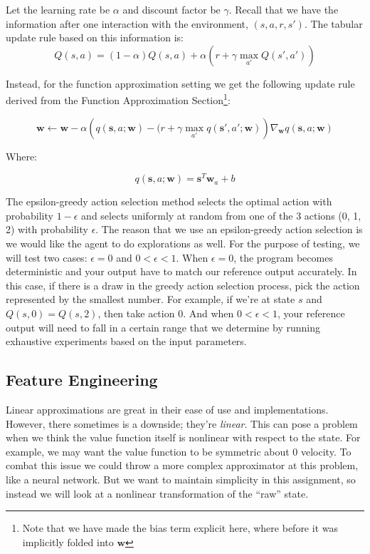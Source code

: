 \documentclass[11pt,addpoints,answers]{exam}
\newcommand{\sv}{\mathbf{s}}
\newcommand{\wv}{\mathbf{w}}
\begin{document}
Let the learning rate be $\alpha$ and discount factor be $\gamma$. Recall that we have the information after one interaction with the environment, $(s, a, r, s')$. The tabular update rule based on this information is: 
\[
    Q(s,a) = (1 - \alpha) Q(s, a) + \alpha \left(r + \gamma \max_{a'} Q(s', a')\right)
\]

Instead, for the function approximation setting we get the following update rule derived from the Function Approximation Section\footnote{Note that we have made the bias term explicit here, where before it was implicitly folded into $\wv$ }:

\[
\wv \leftarrow \wv - \alpha \left(q(\sv, a; \wv) - (r + \gamma \max_{a'} q(\sv', a'; \wv)\right) \nabla_\wv q(\sv, a; \wv)
\]

Where:

\[
q(\sv,a;\wv) = \sv^T \wv_a + b
\]

The epsilon-greedy action selection method selects the optimal action with probability $1 - \epsilon$ and selects uniformly at random from one of the 3 actions (0, 1, 2) with probability $\epsilon$. The reason that we use an epsilon-greedy action selection is we would like the agent to do explorations as well. For the purpose of testing, we will test two cases: $\epsilon = 0$ and $0 < \epsilon < 1$. When $\epsilon = 0$, the program becomes deterministic and your output have to match our reference output accurately. In this case, if there is a draw in the greedy action selection process, pick the action represented by the smallest number. For example, if we're at state $s$ and $Q(s, 0) = Q(s, 2)$, then take action $0$. And when $0 < \epsilon < 1$, your reference output will need to fall in a certain range that we determine by running exhaustive experiments based on the input parameters.


\subsection{Feature Engineering}
Linear approximations are great in their ease of use and implementations. However, there sometimes is a downside; they're \emph{linear}. This can pose a problem when we think the value function itself is nonlinear with respect to the state. For example, we may want the value function to be symmetric about 0 velocity. To combat this issue we could throw a more complex approximator at this problem, like a neural network. But we want to maintain simplicity in this assignment, so instead we will look at a nonlinear transformation of the ``raw'' state.
\end{document}
